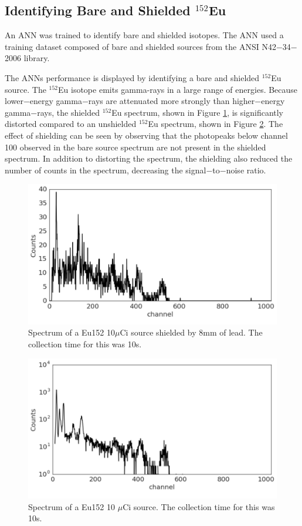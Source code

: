 \documentclass[tocnosub,noragright,centerchapter,12pt,fullpage]{uiucecethesis09}
\begin{document}
\subsection{Identifying Bare and Shielded $^{152}$Eu}

An ANN was trained to identify bare and shielded isotopes. The ANN used a training dataset composed of bare and shielded sources from the ANSI N42$-$34$-$2006 library.

The ANNs performance is displayed by identifying a bare and shielded $^{152}$Eu source. The $^{152}$Eu isotope emits gamma-rays in a large range of energies. Because lower$-$energy gamma$-$rays are attenuated more strongly than higher$-$energy gamma$-$rays, the shielded $^{152}$Eu spectrum, shown in Figure \ref{fig:Shielded_Eu152}, is significantly distorted compared to an unshielded $^{152}$Eu spectrum, shown in Figure \ref{fig:Bare_Eu152}. The effect of shielding can be seen by observing that the photopeaks below channel 100 observed in the bare source spectrum are not present in the shielded spectrum. In addition to distorting the spectrum, the shielding also reduced the number of counts in the spectrum, decreasing the signal$-$to$-$noise ratio. 

\begin{figure}[H]
\centering
\includegraphics[width=0.75\linewidth]{images/Shielded_Eu152}
    \caption{Spectrum of a Eu152 10$\mu$Ci source shielded by 8mm of lead. The collection time for this was 10s.}
\label{fig:Shielded_Eu152}
\end{figure}

\begin{figure}[H]
\centering
\includegraphics[width=0.75\linewidth]{images/Bare_Eu152}
\caption{Spectrum of a Eu152 10 $\mu$Ci source. The collection time for this was 10s.}
\label{fig:Bare_Eu152}
\end{figure}
\end{document}
